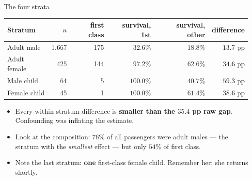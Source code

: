 \documentclass[
  11pt,
  ignorenonframetext,
  aspectratio=169,
]{beamer}
\providecommand{\tightlist}{%
  \setlength{\itemsep}{0pt}\setlength{\parskip}{0pt}}
\begin{document}
\begin{frame}{The four strata}
\protect{}\label{the-four-strata}
\begin{center}
\begin{tabular}{lrrrrr}
\toprule
Stratum & $n$ & first class & survival, 1st & survival, other & difference \\
\midrule
Adult male   & 1,667 & 175 & $32.6\%$  & $18.8\%$ & $13.7$ pp \\
Adult female &   425 & 144 & $97.2\%$  & $62.6\%$ & $34.6$ pp \\
Male child   &    64 &   5 & $100.0\%$ & $40.7\%$ & $59.3$ pp \\
Female child &    45 &   1 & $100.0\%$ & $61.4\%$ & $38.6$ pp \\
\bottomrule
\end{tabular}
\end{center}

\vspace{0.4em}

\begin{itemize}
\tightlist
\item
  Every within-stratum difference is \textbf{smaller than the \(35.4\)
  pp raw gap.} Confounding was inflating the estimate.
\item
  Look at the composition: \(76\%\) of all passengers were adult males
  --- the stratum with the \emph{smallest} effect --- but only \(54\%\)
  of first class.
\item
  Note the last stratum: \textbf{one} first-class female child. Remember
  her; she returns shortly.
\end{itemize}
\end{frame}
\end{document}
